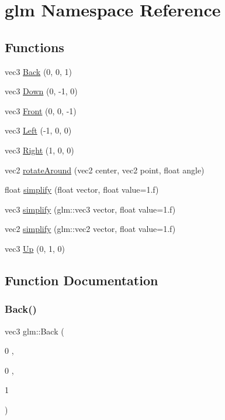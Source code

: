\hypertarget{namespaceglm}{}\section{glm Namespace Reference}
\label{namespaceglm}
\subsection*{Functions}
\begin{DoxyCompactItemize}
\item 
vec3 \mbox{\hyperlink{namespaceglm_a26fcf2bcb45df5795587d13a4e30e74e}{Back}} (0, 0, 1)
\item 
vec3 \mbox{\hyperlink{namespaceglm_a7cc55d622858c4483a942b659dbee30d}{Down}} (0, -\/1, 0)
\item 
vec3 \mbox{\hyperlink{namespaceglm_a95e780de06846d0eee634d15187b87ab}{Front}} (0, 0, -\/1)
\item 
vec3 \mbox{\hyperlink{namespaceglm_a23fef243f5fe738c94f80aad5bf5087d}{Left}} (-\/1, 0, 0)
\item 
vec3 \mbox{\hyperlink{namespaceglm_a8726baea7dc7bb32e57d33b0333d1def}{Right}} (1, 0, 0)
\item 
vec2 \mbox{\hyperlink{namespaceglm_a885c1f58e3aeeb85a2bfacd2c741e8d3}{rotate\+Around}} (vec2 center, vec2 point, float angle)
\item 
float \mbox{\hyperlink{namespaceglm_a877b2ed5ef3e542d953a0768f9494f2b}{simplify}} (float vector, float value=1.f)
\item 
vec3 \mbox{\hyperlink{namespaceglm_a1b1223920ce15b9bc024049ebc24ac25}{simplify}} (glm\+::vec3 vector, float value=1.f)
\item 
vec2 \mbox{\hyperlink{namespaceglm_a091978f9c1c830d7388c42251c59dad4}{simplify}} (glm\+::vec2 vector, float value=1.f)
\item 
vec3 \mbox{\hyperlink{namespaceglm_a35741e27838ab920dff5fbaba619829e}{Up}} (0, 1, 0)
\end{DoxyCompactItemize}


\subsection{Function Documentation}
\mbox{\label{namespaceglm_a26fcf2bcb45df5795587d13a4e30e74e}} 
\subsubsection{\texorpdfstring{Back()}{Back()}}
{\footnotesize\ttfamily vec3 glm\+::\+Back (\begin{DoxyParamCaption}\item[{0}]{,  }\item[{0}]{,  }\item[{1}]{ }\end{DoxyParamCaption})}

